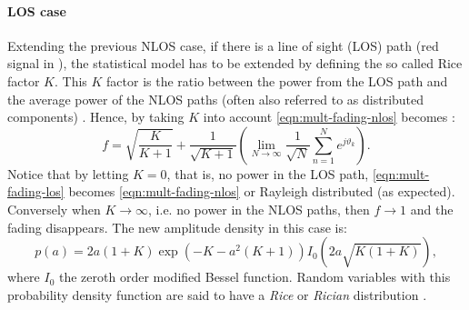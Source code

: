 \paragraph{LOS case}

Extending the previous NLOS case, if there is a line of sight (LOS) path (red signal in ), the statistical model has to be extended by defining the so called Rice factor \(K\). This \(K\) factor is the ratio between the power from the LOS path and the average power of the NLOS paths (often also referred to as distributed components) \cite{Hoher2013}. Hence, by taking \(K\) into account \eqref{eqn:mult-fading-nlos} becomes \cite{Hoher2013}:
\begin{equation} \label{eqn:mult-fading-los}
	f = \sqrt{\frac{K}{K+1}} + 
	\frac{1}{\sqrt{K+1}} \left(
		\lim_{N\rightarrow\infty} 
		\frac{1}{\sqrt{N}}\sum_{n=1}^{N} e^{j \vartheta_k}
	\right).
\end{equation}
Notice that by letting \(K = 0\), that is, no power in the LOS path, \eqref{eqn:mult-fading-los} becomes \eqref{eqn:mult-fading-nlos} or Rayleigh distributed (as expected). Conversely when \(K \to \infty\), i.e. no power in the NLOS paths, then \(f \to 1\) and the fading disappears. The new amplitude density in this case is:
\begin{equation}
	p(a)= 2a(1+K) \exp{\left(-K -a^2 (K+1) \right)} I_0 \left(2a\sqrt{K(1+K)} \right),
\end{equation}
where \(I_0\) the zeroth order modified Bessel function. Random variables with this probability density function are said to have a \emph{Rice} or \emph{Rician} distribution \cite{Hoher2013}.
